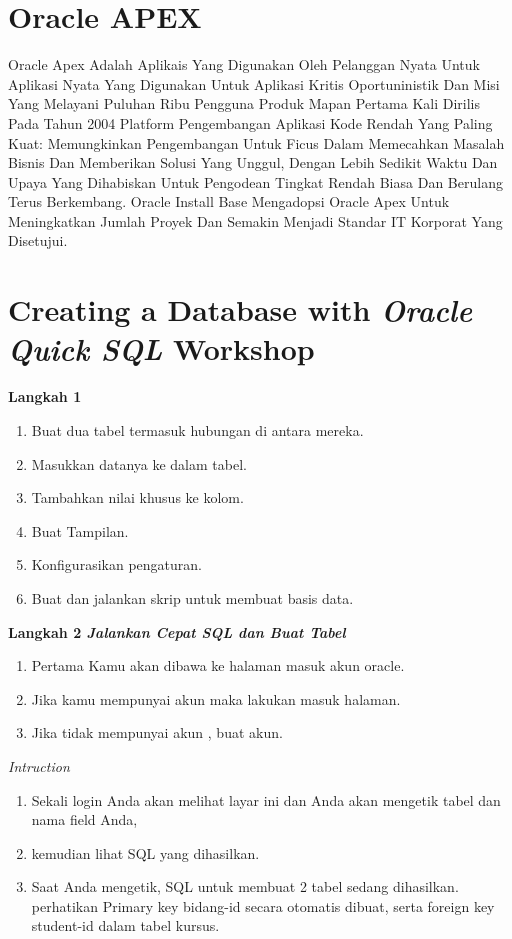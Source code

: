 \documentclass [12pt, times new roman, a4paper]{article}
\begin{document}
\section{Oracle APEX}
Oracle Apex Adalah Aplikais Yang Digunakan Oleh Pelanggan Nyata Untuk
Aplikasi Nyata Yang Digunakan Untuk Aplikasi Kritis Oportuninistik Dan Misi
Yang Melayani Puluhan Ribu Pengguna Produk Mapan Pertama Kali Dirilis
Pada Tahun 2004 Platform Pengembangan Aplikasi Kode Rendah Yang Paling Kuat: Memungkinkan Pengembangan Untuk Ficus Dalam Memecahkan
Masalah Bisnis Dan Memberikan Solusi Yang Unggul, Dengan Lebih Sedikit
Waktu Dan Upaya Yang Dihabiskan Untuk Pengodean Tingkat Rendah Biasa
Dan Berulang Terus Berkembang. Oracle Install Base Mengadopsi Oracle Apex
Untuk Meningkatkan Jumlah Proyek Dan Semakin Menjadi Standar IT Korporat Yang Disetujui.
\section{Creating a Database with \textit{Oracle Quick SQL} Workshop}
\textbf{Langkah 1}
\begin{enumerate}
    \item Buat dua tabel termasuk hubungan di antara mereka.
    \item Masukkan datanya ke dalam tabel.
    \item Tambahkan nilai khusus ke kolom.
    \item Buat Tampilan.
    \item Konfigurasikan pengaturan.
    \item Buat dan jalankan skrip untuk membuat basis data.\\
    \end{enumerate}
\textbf{Langkah 2 \textit{Jalankan Cepat SQL dan Buat Tabel}}
\begin{enumerate}
    \item Pertama Kamu akan dibawa ke halaman masuk akun oracle.
    \item Jika kamu mempunyai akun maka lakukan masuk halaman.
    \item Jika tidak mempunyai akun , buat akun.
    \end{enumerate}
\textit{Intruction}
\begin{enumerate}
    \item 
Sekali login Anda akan melihat layar ini dan Anda akan mengetik tabel dan nama field Anda,
    \item kemudian lihat SQL yang dihasilkan.
    \item Saat Anda mengetik, SQL untuk membuat 2 tabel sedang dihasilkan. perhatikan Primary key bidang-id secara otomatis dibuat, serta foreign key student-id dalam tabel kursus.
\end{enumerate}
\end{document}
